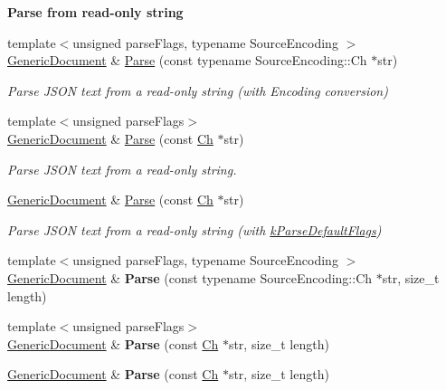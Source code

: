 \begin{Indent}{\bf Parse from read-\/only string}\par
\begin{DoxyCompactItemize}
\item 
{\footnotesize template$<$unsigned parse\+Flags, typename Source\+Encoding $>$ }\\\hyperlink{a00115}{Generic\+Document} \& \hyperlink{a00115_aadee36db7064cc9894a75c848831cdae}{Parse} (const typename Source\+Encoding\+::\+Ch $\ast$str)
\begin{DoxyCompactList}\small\item\em Parse J\+S\+ON text from a read-\/only string (with Encoding conversion) \end{DoxyCompactList}\item 
{\footnotesize template$<$unsigned parse\+Flags$>$ }\\\hyperlink{a00115}{Generic\+Document} \& \hyperlink{a00115_a5e377f840009b5cee6757be29525ce0b}{Parse} (const \hyperlink{a00130_ade0e0ce64ccd5d852da57a35e720bafb}{Ch} $\ast$str)
\begin{DoxyCompactList}\small\item\em Parse J\+S\+ON text from a read-\/only string. \end{DoxyCompactList}\item 
\hyperlink{a00115}{Generic\+Document} \& \hyperlink{a00115_a49ae6de6fd0bc820d9864a106c10b4da}{Parse} (const \hyperlink{a00130_ade0e0ce64ccd5d852da57a35e720bafb}{Ch} $\ast$str)
\begin{DoxyCompactList}\small\item\em Parse J\+S\+ON text from a read-\/only string (with \hyperlink{a00683_ab7be7dabe6ffcba60fad441505583450a9104b0946d648e9467cb7a967401ec80}{k\+Parse\+Default\+Flags}) \end{DoxyCompactList}\item 
{\footnotesize template$<$unsigned parse\+Flags, typename Source\+Encoding $>$ }\\\hyperlink{a00115}{Generic\+Document} \& {\bfseries Parse} (const typename Source\+Encoding\+::\+Ch $\ast$str, size\+\_\+t length)\hypertarget{a00115_a46b5028cc760c4e915a0d5216af9f7e2}{}\label{a00115_a46b5028cc760c4e915a0d5216af9f7e2}

\item 
{\footnotesize template$<$unsigned parse\+Flags$>$ }\\\hyperlink{a00115}{Generic\+Document} \& {\bfseries Parse} (const \hyperlink{a00130_ade0e0ce64ccd5d852da57a35e720bafb}{Ch} $\ast$str, size\+\_\+t length)\hypertarget{a00115_a93fec16eacec4f4b42075bb3bc242a6b}{}\label{a00115_a93fec16eacec4f4b42075bb3bc242a6b}

\item 
\hyperlink{a00115}{Generic\+Document} \& {\bfseries Parse} (const \hyperlink{a00130_ade0e0ce64ccd5d852da57a35e720bafb}{Ch} $\ast$str, size\+\_\+t length)\hypertarget{a00115_ab13d8358acc0648e3f91f6b825365e4f}{}\label{a00115_ab13d8358acc0648e3f91f6b825365e4f}

\end{DoxyCompactItemize}
\end{Indent}
